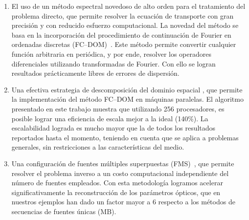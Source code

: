 \begin{enumerate}
\item El uso de un método espectral novedoso de alto orden
para el tratamiento del problema directo, que permite resolver la 
ecuación de transporte con gran precisión y con reducido esfuerzo 
computacional. La novedad del método se basa en la incorporación 
del procedimiento de continuación de Fourier 
en ordenadas discretas (FC--DOM)~\cite{Gaggioli2019}. 
Este método permite convertir cualquier función arbitraria en periódica, y 
por ende, resolver los operadores diferenciales utilizando transformadas 
de Fourier. Con ello se logran resultados prácticamente libres de 
errores de dispersión.

\item Una efectiva estrategia de descomposición del dominio espacial 
\cite{Gaggioli2022}, 
que permite la implementación del método FC--DOM en máquinas paralelas. 
El algoritmo presentado en este trabajo muestra que utilizando 
256 procesadores, es posible lograr una eficiencia de escala 
mejor a la ideal (140\%). 
La escalabilidad lograda es mucho mayor que la de todos los 
resultados reportados hasta el momento, teniendo en cuenta que 
se aplica a problemas generales, sin restricciones a las 
características del medio.

\item Una configuración de fuentes múltiples superpuestas (FMS)~\cite{Gaggioli2022}, 
que permite resolver el problema inverso a un costo computacional 
independiente del número de fuentes empleados. 
Con esta metodología logramos acelerar significativamente la reconstrucción 
de los parámetros ópticos, que en nuestros ejemplos han dado un factor mayor a 6 
respecto a los métodos de secuencias de fuentes únicas (MB).

\end{enumerate}

